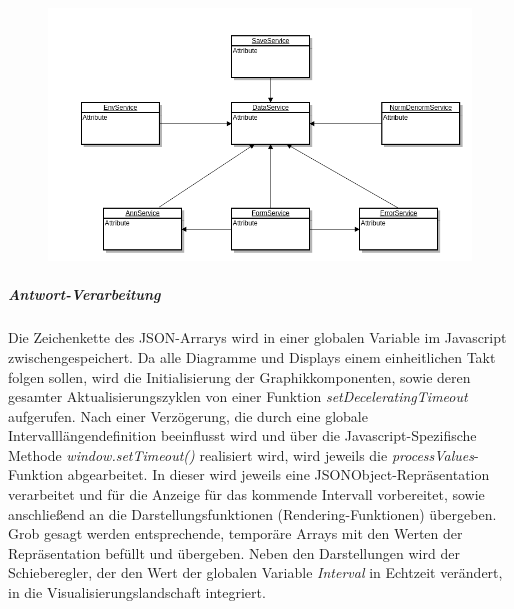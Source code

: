 \begin{figure}[H]
\includegraphics[width=15cm]{Bilder/Umsetzung/sequence_dia_service_layer.png}
\end{figure}


\subparagraph{Antwort-Verarbeitung}
Die Zeichenkette des JSON-Arrarys wird in einer globalen Variable im Javascript zwischengespeichert. Da alle Diagramme und Displays einem einheitlichen Takt folgen sollen, wird die Initialisierung der Graphikkomponenten, sowie deren gesamter Aktualisierungszyklen von einer Funktion \emph{setDeceleratingTimeout} aufgerufen. Nach einer Verzögerung, die durch eine globale Intervalllängendefinition beeinflusst wird und über die Javascript-Spezifische Methode \emph{window.setTimeout()} realisiert wird, wird jeweils die \emph{processValues}-Funktion abgearbeitet. In dieser wird jeweils eine JSONObject-Repräsentation verarbeitet und für die Anzeige für das kommende Intervall vorbereitet, sowie anschließend an die Darstellungsfunktionen (Rendering-Funktionen) übergeben. Grob gesagt werden entsprechende, temporäre Arrays mit den Werten der Repräsentation befüllt und übergeben. Neben den Darstellungen wird der Schieberegler, der den Wert der globalen Variable \emph{Interval} in Echtzeit verändert, in die Visualisierungslandschaft integriert. 


